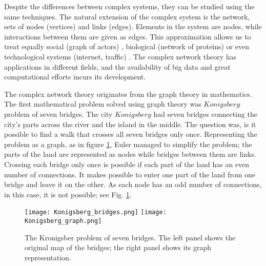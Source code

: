 Despite the differences between complex systems, they can be studied using the same techniques. The natural extension of the complex system is the network, sets of nodes (vertices) and links (edges). Elements in the system are nodes, while interactions between them are given as edges. This approximation allows us to treat equally social \cite{myers2014, sarigol2014} (graph of actors) , biological (network of proteins) \cite{fraiman2009ising, schneider2011modeling} or even technological systems (internet, traffic) \cite{costa2007characterization, costa2011analyzing, newman2003structure}. The complex network theory has applications in different fields, and the availability of big data and great computational efforts incurs its development. 

The complex network theory originates from the graph theory in mathematics. 
The first mathematical problem solved using graph theory was $Konigsberg$ problem of seven bridges. The city $Konigsberg$ had seven bridges connecting the city's parts across the river and the island in the middle. The question was, is it possible to find a walk that crosses all seven bridges only once. Representing the problem as a graph, as in figure \ref{fig:Krgraph}, Euler managed to simplify the problem; the parts of the land are represented as nodes while bridges between them are links. Crossing each bridge only once is possible if each part of the land has an even number of connections. It makes possible to enter one part of the land from one bridge and leave it on the other. As each node has an odd number of connections, in this case, it is not possible; see Fig. \ref{fig:Krgraph}.

\begin{figure}[!ht]
	\centering
	\texttt{[image: Konigsberg\_bridges.png]} \hspace{2cm}
	\texttt{[image: Konigsberg\_graph.png]}
	\caption[Konigsberg problem of seven bridges.]{The Kronigsber problem of seven bridges. The left panel shows the original map of the bridges; the right panel shows its graph representation. }

	\label{fig:Krgraph}
\end{figure}

